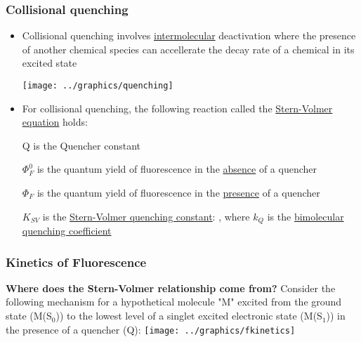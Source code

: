 \documentclass[a4paper,12pt,titlepage]{article}
\begin{document}
\begin{frame}
\frametitle{Collisional quenching}
 {
\begin{itemize}
\item<1-2> Collisional quenching involves \underline{intermolecular} deactivation where the presence of another chemical species can accellerate the decay rate of a chemical in its excited state\\
\begin{center} \texttt{[image: ../graphics/quenching]} \end{center}
\item<2> For collisional quenching, the following reaction called the \underline{Stern-Volmer equation} holds: 
\end{itemize} }
 {
\centering {}
\begin{itemize}
\item [Q] is the Quencher constant 
\item [\(\Phi^0_F\)] is the quantum yield of fluorescence in the \underline{absence} of a quencher
\item [\(\Phi_F\)] is the quantum yield of fluorescence in the \underline{presence} of a quencher
\item [\(K_{SV}\)] is the \underline{Stern-Volmer quenching constant}: , \enspace where \(k_Q\) is the \underline{bimolecular quenching coefficient}
\end{itemize}
}
\end{frame}

\begin{frame}[t]
\frametitle{Kinetics of Fluorescence}
\textbf{Where does the Stern-Volmer relationship come from?}\newline
\textbullet \enspace Consider the following mechanism for a hypothetical molecule "M" excited from the ground state (M(S\(_0\))) to the lowest level of a singlet excited electronic state (M(S\(_1\))) in the presence of a quencher (Q):\newline
{}
\texttt{[image: ../graphics/fkinetics]} 
\small
{}
\end{frame}
\end{document}
